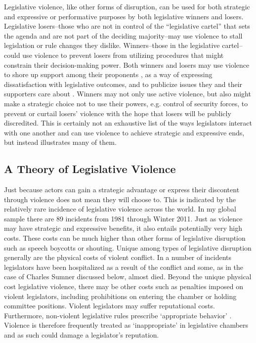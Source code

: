 \documentclass[a4paper]{article}\usepackage[]{graphicx}\usepackage[]{color}
\begin{document}
Legislative violence, like other forms of disruption, can be used for both strategic \citep[see][]{Beaulieu2008,BeaulieuForthcoming} and expressive or performative \citep[see][]{Rai2013,Spary2013} purposes by both legislative winners and losers. Legislative losers--those who are not in control of the ``legislative cartel''  that sets the agenda \citep{cox2007} and are not part of the deciding majority--may use violence to stall legislation or rule changes they dislike. Winners--those in the legislative cartel--could use violence to prevent losers from utilizing procedures that might constrain their decision-making power. Both winners and losers may use violence to shore up support among their proponents \citep{wilkinson2006}, as a way of expressing dissatisfaction with legislative outcomes, and to publicize issues they and their supporters care about \citep{Spary2013}. Winners may not only use active violence, but also might make a strategic choice not to use their powers, e.g. control of security forces, to prevent or curtail losers' violence \citep[see the work on ethnic violence in India by][]{wilkinson2006} with the hope that losers will be publicly discredited. This is certainly not an exhaustive list of the ways legislators interact with one another and can use violence to achieve strategic and expressive ends, but instead illustrates many of them.

\subsection{A Theory of Legislative Violence}

Just because actors can gain a strategic advantage or express their discontent through violence does not mean they will choose to. This is indicated by the relatively rare incidence of legislative violence across the world. In my global sample there are 89 incidents from 1981 through Winter 2011. Just as violence may have strategic and expressive benefits, it also entails potentially very high costs. These costs can be much higher than other forms of legislative disruption such as speech boycotts or shouting. Unique among types of legislative disruption generally are the physical costs of violent conflict. In a number of incidents legislators have been hospitalized as a result of the conflict and some, as in the case of Charles Sumner discussed below, almost died. Beyond the unique physical cost legislative violence, there may be other costs such as penalties imposed on violent legislators, including prohibitions on entering the chamber or holding committee positions. Violent legislators may suffer reputational costs. Furthermore, non-violent legislative rules prescribe `appropriate behavior' \citep{March2008}. Violence is therefore frequently treated as `inappropriate' in legislative chambers and as such could damage a legislator's reputation. 
\end{document}
